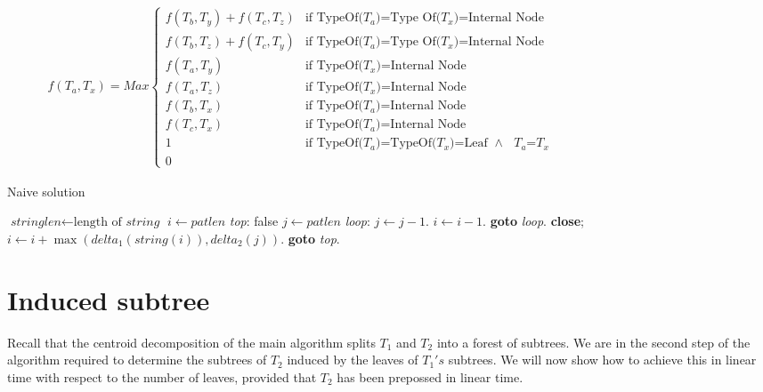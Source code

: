 \begin{equation*}
	\begin{aligned}
		f(T_a,T_x)=Max
		\begin{cases}
			f(T_b,T_y)+f(T_c,T_z) & \text{if TypeOf($T_a$)=Type Of($T_x$)=Internal Node}
			\\
			f(T_b,T_z)+f(T_c,T_y) &  \text{if TypeOf($T_a$)=Type Of($T_x$)=Internal Node}
			\\
			f(T_a, T_y)           & \text{if TypeOf($T_x$)=Internal Node}
			\\
			f(T_a, T_z)           & \text{if TypeOf($T_x$)=Internal Node}
			\\
			f(T_b, T_x)           & \text{if TypeOf($T_a$)=Internal Node}
			\\
			f(T_c, T_x)           & \text{if TypeOf($T_a$)=Internal Node}
			\\
			1 	                  & \text{if TypeOf($T_a$)=TypeOf($T_x$)=Leaf  $\land$  $T_a$=$T_x$}
			\\
			0                     
		\end{cases}
	\end{aligned}
	\phantom{\hspace{6cm}}
\end{equation*}


\begin{algorithm}
	\caption{Naive solution}\label{euclid}
	\begin{algorithmic}[1]
		\State $\textit{stringlen} \gets \text{length of }\textit{string}$
		\State $i \gets \textit{patlen}$
		\BState \emph{top}:
		 \Return false
		\EndIf
		\State $j \gets \textit{patlen}$
		\BState \emph{loop}:
		\State $j \gets j-1$.
		\State $i \gets i-1$.
		\State \textbf{goto} \emph{loop}.
		\State \textbf{close};
		\EndIf
		\State $i \gets i+\max(\textit{delta}_1(\textit{string}(i)),\textit{delta}_2(j))$.
		\State \textbf{goto} \emph{top}.
		\EndProcedure
	\end{algorithmic}
\end{algorithm}


\section{Induced subtree}
Recall that the centroid decomposition of the main algorithm splits $T_1$ and $T_2$ into a forest of subtrees. We are in the second step of the algorithm required to determine the subtrees of $T_2$ induced by the leaves of $T_1's$ subtrees. 
We will now show how to achieve this in linear time with respect to the number of leaves, provided that $T_2$ has been prepossed in linear time.

